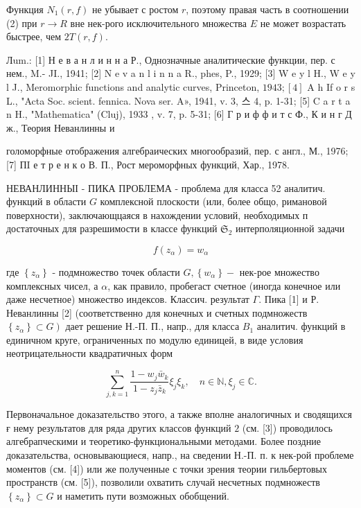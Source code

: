 \documentclass[10pt]{article}
\begin{document}
Функция $N_{1}(r, f)$ не убывает с ростом $r$, поэтому правая часть в соотношении (2) при $r \rightarrow R$ вне нек-рого исключительного множества $E$ не может возрастать быстрее, чем $2 T(r, f)$.



Лum.: [1] Н е в а н л и н н а Р., Однозначные аналитические функции, пер. с нем., M.- JI., 1941; [2] N e v a n l i n n a R., phes, P., 1929; [3] W e y l H., W e y l J., Meromorphic functions and analytic curves, Princeton, $1943 ;[4]$ A h If o r s L., "Acta Soc. scient. fennica. Nova ser. A», 1941, v. 3, 스 4, p. 1-31; [5] C a r t a n H., "Mathematica" (Cluj), 1933 , v. 7, p. 5-31; [6] Г р и ф ф и т с Ф., К и н г Д ж., Теория Неванлинны и

голоморфные отображения алгебраических многообразий, пер. с англ., М., 1976; [7] ПI е т р е н к о В. П., Рост мероморфных функций, Хар., 1978.



НЕВАНЛИННЫІ - ПИКА ПРОБЛЕМА - проблема для класса 52 аналитич. функций в области $G$ комплексной плоскости (или, более общо, римановой поверхности), заключающцаяся в нахождении условий, необходимых п достаточных для разрешимости в классе функций $\mathfrak{S}_{2}$ интерполяционной задачи



\[

f\left(z_{\alpha}\right)=w_{\alpha}

\]



где $\left\{z_{\alpha}\right\}$ - подмножество точек области $G,\left\{w_{\alpha}\right\}-$ нек-рое множество комплексных чисел, а $\alpha$, как правило, пробегаст счетное (иногда конечное или даже несчетное) множество индексов. Классич. результат $\Gamma$. Пика [1] и Р. Неванлинны [2] (соответственно для конечных и счетных подмножеств $\left.\left\{z_{\alpha}\right\} \subset G\right)$ дает решение Н.-П. П., напр., для класса $B_{1}$ аналитич. функций в единичном круге, ограниченных по модулю единицей, в виде условия неотрицательности квадратичных форм



\[

\sum_{j, k=1}^{n} \frac{1-w_{j} \bar{w}_{k}}{1-z_{j} \bar{z}_{k}} \xi_{j} \xi_{k}, \quad n \in \mathbb{N}, \xi_{j} \in \mathbb{C} .

\]



Первоначальное доказательство этого, а также вполне аналогичных и сводящихся ғ нему результатов для ряда других классов функций $\mathfrak{2}$ (см. [3]) проводилось алгебрапческими и теоретико-функциональными методами. Более поздние доказательства, основывающиеся, напр., на сведении Н.-П. п. к нек-рой проблеме моментов (см. [4]) или же полученные с точки зрения теории гильбертовых пространств (см. [5]), позволили охватить случай несчетных подмножеств $\left\{z_{\alpha}\right\} \subset G$ и наметить пути возможных обобщений.
\end{document}
